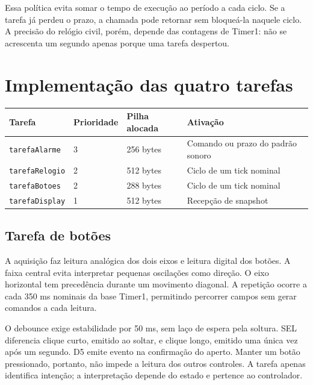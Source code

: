 Essa política evita somar o tempo de execução ao período a cada ciclo. Se a tarefa já perdeu o prazo, a chamada pode retornar sem bloqueá-la naquele ciclo. A precisão do relógio civil, porém, depende das contagens de Timer1: não se acrescenta um segundo apenas porque uma tarefa despertou. \autocite{fonte10}

\section{Implementação das quatro tarefas}

\begin{center}\small
\begin{tabularx}{\textwidth}{@{}YYYY@{}}\toprule

\textbf{Tarefa} & \textbf{Prioridade} & \textbf{Pilha alocada} & \textbf{Ativação} \\ \midrule

\texttt{tarefaAlarme} & 3 & 256 bytes & Comando ou prazo do padrão sonoro \\

\texttt{tarefaRelogio} & 2 & 512 bytes & Ciclo de um tick nominal \\

\texttt{tarefaBotoes} & 2 & 288 bytes & Ciclo de um tick nominal \\

\texttt{tarefaDisplay} & 1 & 512 bytes & Recepção de snapshot \\

\bottomrule\end{tabularx}
\end{center}

\subsection{Tarefa de botões}

A aquisição faz leitura analógica dos dois eixos e leitura digital dos botões. A faixa central evita interpretar pequenas oscilações como direção. O eixo horizontal tem precedência durante um movimento diagonal. A repetição ocorre a cada 350 ms nominais da base Timer1, permitindo percorrer campos sem gerar comandos a cada leitura.

O debounce exige estabilidade por 50 ms, sem laço de espera pela soltura. SEL diferencia clique curto, emitido ao soltar, e clique longo, emitido uma única vez após um segundo. D5 emite evento na confirmação do aperto. Manter um botão pressionado, portanto, não impede a leitura dos outros controles. A tarefa apenas identifica intenção; a interpretação depende do estado e pertence ao controlador.

